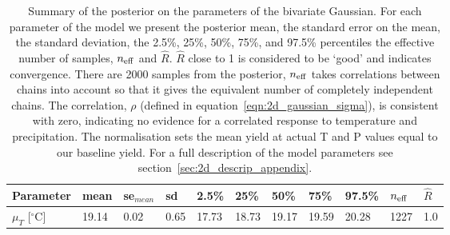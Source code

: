 \documentclass[12pt]{iopart}
\begin{document}
\begin{table}
\centering
\caption{Summary of the posterior on the parameters of the bivariate Gaussian. For each parameter of the model we present the posterior mean, the standard error on the mean, the standard deviation, the 2.5\%, 25\%, 50\%, 75\%, and 97.5\% percentiles the effective number of samples, $n_{\rm eff}$ and $\hat{R}$. $\hat{R}$ close to 1 is considered to be `good' and indicates convergence. There are 2000 samples from the posterior, $n_{\rm eff}$ takes correlations between chains into account so that it gives the equivalent number of completely independent chains. The correlation, $\rho$ (defined in equation~\ref{eqn:2d_gaussian_sigma}), is consistent with zero, indicating no evidence for a correlated response to temperature and precipitation. The normalisation sets the mean yield at actual T and P values equal to our baseline yield. For a full description of the model parameters see section~\ref{sec:2d_descrip_appendix}.}
\label{table:posterior}
\vskip 0.15in
\small
\begin{tabular}{lllllllllll}
Parameter             &  mean  & se$_{mean}$ & sd   & 2.5\%  & 25\%   & 50\%   & 75\%    & 97.5\% & $n_{\rm eff}$ & $\hat{R}$\\
\hline
$\mu_T$ [$^\circ$C]     & 19.14   &   0.02    &   0.65  &  17.73  & 18.73   &  19.17  &   19.59 & 20.28   &    1227 &    1.0\\

\end{tabular}
\end{table}
\end{document}
